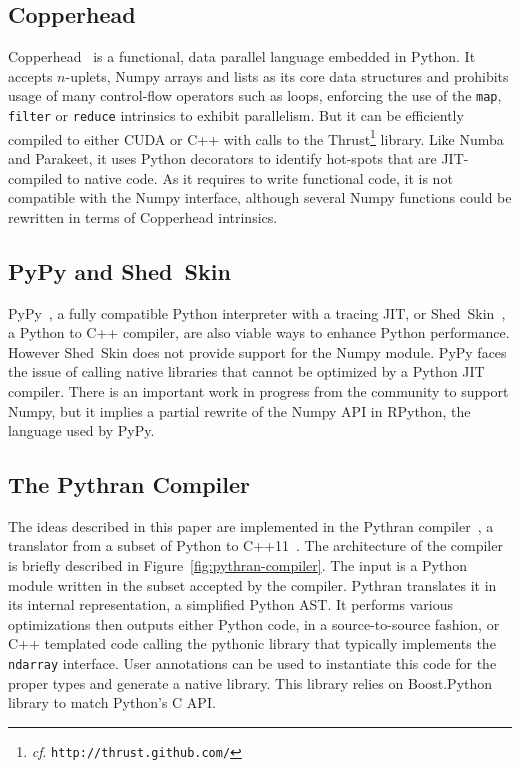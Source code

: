\documentclass[10pt, preprint]{sigplanconf}
\begin{document}
\subsection{Copperhead}

Copperhead~\cite{copperhead2011} is a functional, data parallel language
embedded in Python. It accepts $n$-uplets, Numpy arrays and lists as its core data
structures and prohibits usage of many control-flow operators such as loops,
enforcing the use of the \texttt{map}, \texttt{filter} or \texttt{reduce}
intrinsics to exhibit parallelism. But it can be efficiently compiled to either
CUDA or C++ with calls to the Thrust\footnote{\emph{cf}.
\texttt{http://thrust.github.com/}} library. Like Numba and Parakeet, it uses
Python decorators to identify hot-spots that are JIT-compiled to native code.
As it requires to write functional code, it is not compatible with the Numpy
interface, although several Numpy functions could be rewritten in terms of
Copperhead intrinsics.

\subsection{PyPy and Shed~Skin}

PyPy~\cite{pypy2009}, a fully compatible Python interpreter with a tracing JIT,
or Shed~Skin~\cite{shedskin2006}, a Python to C++ compiler, are also viable
ways to enhance Python performance. However Shed~Skin does not provide support
for the Numpy module. PyPy faces the issue of calling native libraries that
cannot be optimized by a Python JIT compiler. There is an important work in
progress from the community to support Numpy, but it implies a partial rewrite
of the Numpy API in RPython, the language used by PyPy.

\subsection{The Pythran Compiler}

The ideas described in this paper are implemented in the Pythran
compiler~\cite{pythran2013}, a translator from a subset of Python to
C++11~\cite{isocxx11}. The architecture of the compiler is briefly described
in Figure~\ref{fig:pythran-compiler}. The input is a Python module written in
the subset accepted by the compiler. Pythran translates it in its internal representation, a
simplified Python AST. It performs various optimizations then outputs either
Python code, in a source-to-source fashion, or C++ templated code calling the pythonic library that typically implements the \texttt{ndarray}
interface. User annotations can be used to instantiate this code for the proper
types and generate a native library. This library relies on Boost.Python
library to match Python's C API.
\end{document}
